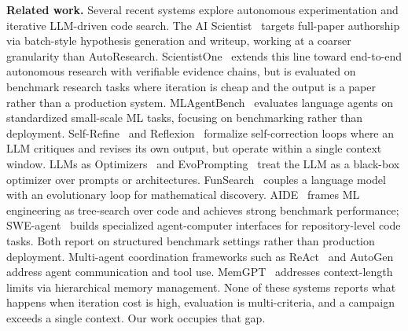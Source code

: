 \documentclass[conference]{IEEEtran}
\begin{document}
\textbf{Related work.} Several recent systems explore autonomous experimentation and iterative LLM-driven code search. The AI Scientist~\cite{lu2024aiscientist} targets full-paper authorship via batch-style hypothesis generation and writeup, working at a coarser granularity than AutoResearch. ScientistOne~\cite{meng2026scientistone} extends this line toward end-to-end autonomous research with verifiable evidence chains, but is evaluated on benchmark research tasks where iteration is cheap and the output is a paper rather than a production system. MLAgentBench~\cite{huang2024mlagentbench} evaluates language agents on standardized small-scale ML tasks, focusing on benchmarking rather than deployment. Self-Refine~\cite{madaan2023selfrefine} and Reflexion~\cite{shinn2023reflexion} formalize self-correction loops where an LLM critiques and revises its own output, but operate within a single context window. LLMs as Optimizers~\cite{yang2024optimizers} and EvoPrompting~\cite{chen2023evoprompting} treat the LLM as a black-box optimizer over prompts or architectures. FunSearch~\cite{romeraparedes2024funsearch} couples a language model with an evolutionary loop for mathematical discovery. AIDE~\cite{jiang2025aide} frames ML engineering as tree-search over code and achieves strong benchmark performance; SWE-agent~\cite{yang2024sweagent} builds specialized agent-computer interfaces for repository-level code tasks. Both report on structured benchmark settings rather than production deployment. Multi-agent coordination frameworks such as ReAct~\cite{yao2023react} and AutoGen~\cite{wu2023autogen} address agent communication and tool use. MemGPT~\cite{packer2023memgpt} addresses context-length limits via hierarchical memory management. None of these systems reports what happens when iteration cost is high, evaluation is multi-criteria, and a campaign exceeds a single context. Our work occupies that gap.
\end{document}

